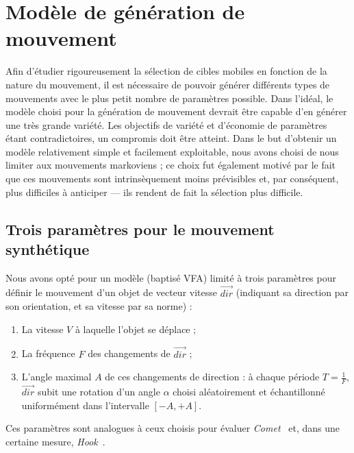 \section{Modèle de génération de mouvement}
	Afin d'étudier rigoureusement la sélection de cibles mobiles en fonction de la nature du mouvement, il est nécessaire de pouvoir générer différents types de mouvements avec le plus petit nombre de paramètres possible. Dans l'idéal, le modèle choisi pour la génération de mouvement devrait être capable d'en générer une très grande variété. Les objectifs de variété et d'économie de paramètres étant contradictoires, un compromis doit être atteint. Dans le but d'obtenir un modèle relativement simple et facilement exploitable, nous avons choisi de nous limiter aux mouvements markoviens ; ce choix fut également motivé par le fait que ces mouvements sont intrinsèquement moins prévisibles et, par conséquent, plus difficiles à anticiper --- ils rendent de fait la sélection plus difficile.
	
	\FloatBarrier \subsection{Trois paramètres pour le mouvement synthétique}
	Nous avons opté pour un modèle (baptisé VFA) limité à trois paramètres pour définir le mouvement d'un objet de vecteur vitesse $\vec{dir}$ (indiquant sa direction par son orientation, et sa vitesse par sa norme) :
	\begin{enumerate}
		\item La vitesse $V$ à laquelle l'objet se déplace ;
		\item La fréquence $F$ des changements de $\vec{dir}$ ;
		\item L'angle maximal $A$ de ces changements de direction : à chaque période $T = \frac{1}{F}$, $\vec{dir}$ subit une rotation d'un angle $\alpha$ choisi aléatoirement et échantillonné uniformément dans l'intervalle $[-A, +A]$.
	\end{enumerate}
	
	Ces paramètres sont analogues à ceux choisis pour évaluer \emph{Comet}~\cite{hasan2011comet} et, dans une certaine mesure, \emph{Hook}~\cite{ortega2013hook}.
	
